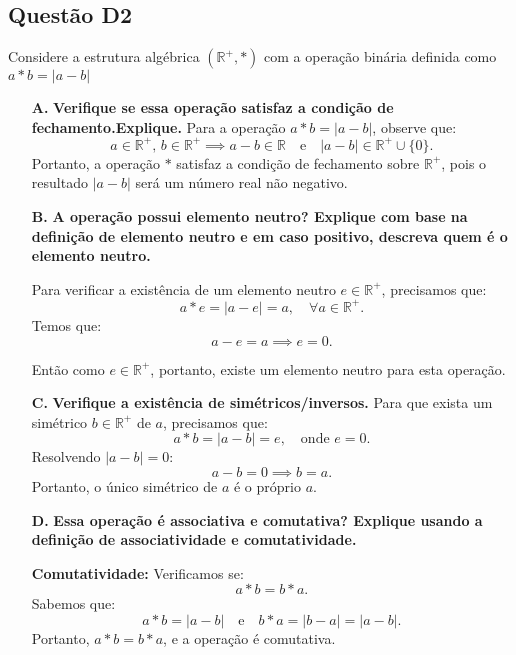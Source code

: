 \documentclass{article}
\begin{document}
\subsection{Questão D2}
Considere a estrutura algébrica $(\mathbb{R}^+, \ast)$ com a operação binária definida como $a \ast b = |a - b|$

\begin{enumerate}
    \item[\textbf{A.}] \textbf{Verifique se essa operação satisfaz a condição de fechamento.Explique.}
    Para a operação \( a \ast b = |a - b| \), observe que:
    \[
    a \in \mathbb{R}^+, \, b \in \mathbb{R}^+ \implies a - b \in \mathbb{R} \quad \text{e} \quad |a - b| \in \mathbb{R}^+ \cup \{0\}.
    \]
    Portanto, a operação \( \ast \) satisfaz a condição de fechamento sobre \( \mathbb{R}^+ \), pois o resultado \( |a - b| \) será um número real não negativo.
    
    \item[\textbf{B.}] \textbf{A operação possui elemento neutro? Explique com base na definição de elemento neutro e em caso positivo, descreva quem é o elemento neutro.}

    Para verificar a existência de um elemento neutro \( e \in \mathbb{R}^+ \), precisamos que:
    \[
    a \ast e = |a - e| = a, \quad \forall a \in \mathbb{R}^+.
    \]
    Temos que:
    \[
    a - e = a \implies e = 0.
    \]

    Então como \( e \in \mathbb{R}^+ \), portanto, existe um elemento neutro para esta operação.
    \item[\textbf{C.}] \textbf{Verifique a existência de simétricos/inversos.}
    Para que exista um simétrico \( b \in \mathbb{R}^+ \) de \( a \), precisamos que:
    \[
    a \ast b = |a - b| = e, \quad \text{onde } e = 0.
    \]
    Resolvendo \( |a - b| = 0 \):
    \[
    a - b = 0 \implies b = a.
    \]
    Portanto, o único simétrico de \( a \) é o próprio \( a \).
    \item[\textbf{D.}] \textbf{Essa operação é associativa e comutativa? Explique usando a definição de associatividade e comutatividade.}
    
    \textbf{Comutatividade:} Verificamos se:
    \[
    a \ast b = b \ast a.
    \]
    Sabemos que:
    \[
    a \ast b = |a - b| \quad \text{e} \quad b \ast a = |b - a| = |a - b|.
    \]
    Portanto, \( a \ast b = b \ast a \), e a operação é comutativa.


\end{enumerate}
\end{document}
